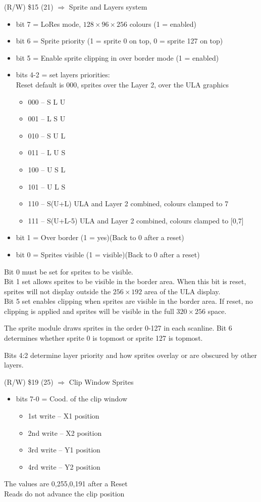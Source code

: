 (R/W) \$15 (21) $\Rightarrow$ Sprite and Layers system
\begin{itemize}
\item[] bit 7 = LoRes mode, $128\times96\times256$ colours (1 =
  enabled)
\item[] bit 6 = Sprite priority (1 = sprite 0 on top, 0 = sprite 127
  on top)
\item[] bit 5 = Enable sprite clipping in over border mode (1 =
  enabled)
\item[] bits 4-2 = set layers priorities:\\
Reset default is 000, sprites over the Layer 2, over the ULA graphics
\begin{itemize}
\item[] 000 – S L U
\item[] 001 – L S U
\item[] 010 – S U L
\item[] 011 – L U S
\item[] 100 – U S L
\item[] 101 – U L S
\item[] 110 – S(U+L) ULA and Layer 2 combined, colours clamped to 7
\item[] 111 – S(U+L-5) ULA and Layer 2 combined, colours clamped to
  [0,7]
\end{itemize}
\item[] bit 1 = Over border (1 = yes)(Back to 0 after a reset)
\item[] bit 0 = Sprites visible (1 = visible)(Back to 0 after a reset)
\end{itemize}
Bit 0 must be set for sprites to be visible.\\
Bit 1 set allows sprites to be visible in the border area. When this
bit is reset, sprites will not display outside the $256\times192$ area
of the ULA display.\\
Bit 5 set enables clipping when sprites are visible in the border
area. If reset, no clipping is applied and sprites will be visible in
the full $320\times256$ space.

The sprite module draws sprites in the order 0-127 in each
scanline. Bit 6 determines whether sprite 0 is topmost or sprite 127
is topmost.

Bits 4:2 determine layer priority and how sprites overlay or are
obscured by other layers.

(R/W) \$19 (25) $\Rightarrow$ Clip Window Sprites
\begin{itemize}
\item[] bits 7-0 = Cood. of the clip window
  \begin{itemize}
  \item[] 1st write – X1 position
  \item[] 2nd write – X2 position
  \item[] 3rd write – Y1 position
  \item[] 4rd write – Y2 position
  \end{itemize}
\end{itemize}
The values are 0,255,0,191 after a Reset\\
Reads do not advance the clip position

